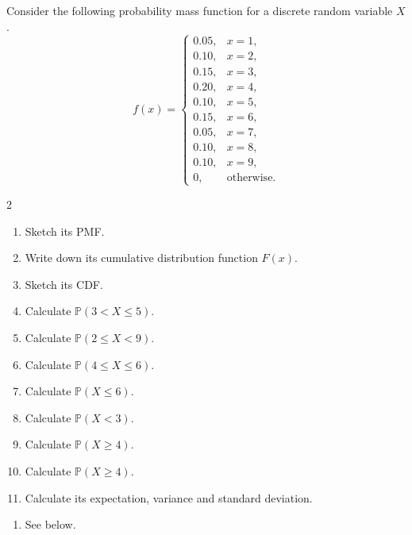\documentclass[../main.tex]{subfiles}
\begin{document}
\begin{exercise}
  Consider the following probability mass function for a discrete random variable \(X\).
  \[
    f(x) =
    \begin{cases}
      0.05, & x = 1,\\
      0.10, & x = 2,\\
      0.15, & x = 3,\\
      0.20, & x = 4,\\
      0.10, & x = 5,\\
      0.15, & x = 6,\\
      0.05, & x = 7,\\
      0.10, & x = 8,\\
      0.10, & x = 9,\\
      0, & \text{otherwise}.
    \end{cases}
  \]

  \begin{multicols}{2}
    \begin{enumerate}
      \item Sketch its PMF.
      \item Write down its cumulative distribution function \(F(x)\).
      \item Sketch its CDF.
      \item Calculate \(\mathbb{P}(3 < X \le 5)\).
      \item Calculate \(\mathbb{P}(2 \le X < 9)\).
      \item Calculate \(\mathbb{P}(4 \le X \le 6)\).
      \item Calculate \(\mathbb{P}(X \le 6)\).
      \item Calculate \(\mathbb{P}(X < 3)\).
      \item Calculate \(\mathbb{P}(X \ge 4)\).
      \item Calculate \(\mathbb{P}(X \ge 4)\).
      \item Calculate its expectation, variance and standard deviation.
    \end{enumerate}
  \end{multicols}

  \begin{solution}
    \begin{enumerate}
      \item See below.


\end{enumerate}
\end{solution}
\end{exercise}
\end{document}
